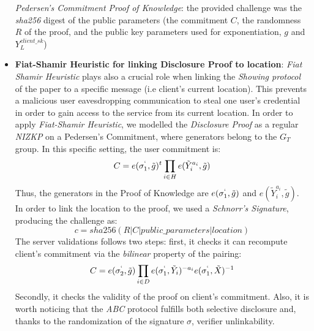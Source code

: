 \documentclass[10pt,conference,compsocconf]{IEEEtran}
\begin{document}
\begin{itemize}
    \textit{Pedersen's Commitment Proof of Knowledge}: the provided challenge was the \textit{sha256} digest of the public parameters
    (the commitment $C$, the randomness $R$ of the proof, and the public key parameters used for exponentiation, $g$ and $Y_{L}^{client\_sk}$)
    \item \textbf{Fiat-Shamir Heuristic for linking Disclosure Proof to location}: \textit{Fiat Shamir Heuristic} plays also a crucial role when
    linking the \textit{Showing protocol} of the paper to a specific message (i.e client's current location). This prevents a malicious user
    eavesdropping communication to steal one user's credential in order to gain access to the service from its current location.
    In order to apply \textit{Fiat-Shamir Heuristic}, we modelled the \textit{Disclosure Proof} as a regular \textit{NIZKP} on a Pedersen's Commitment,
    where generators belong to the $G_T$ group.\newline
    In this specific setting, the user commitment is: \[C=e(\sigma_{1}^{`}, \tilde{g})^t\prod_{i \in H}e(\tilde{Y}_{i}^{a_i},\tilde{g})\]Thus,
    the generators in the Proof of Knowledge are $e(\sigma_{1}^{`}, \tilde{g})$ and $e(\tilde{Y}_{i}^{a_i},\tilde{g})$.
    In order to link the location to the proof, we used a \textit{Schnorr's Signature}, producing the challenge as:
    \[c = sha256(R|C|public\_parameters|location)\]
    The server validations follows two steps: first, it checks it can recompute client's commitment via the \textit{bilinear} property of the pairing:
    \[C = e(\sigma_2^`,\tilde{g})\prod_{i \in D}e(\sigma_1^`,\tilde{Y}_i)^{-a_i}e(\sigma_1^`,\tilde{X})^{-1}\]
    Secondly, it checks the validity of the proof on client's commitment. Also, it is worth noticing that the \textit{ABC} protocol fulfills both selective disclosure and, thanks to the randomization of the signature $\sigma$, verifier unlinkability.
\end{itemize}
\end{document}
